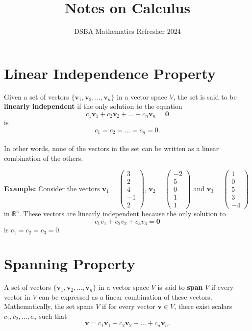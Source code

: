 \documentclass[]{article}
\title{Notes on Calculus}
\author{DSBA Mathematics Refresher 2024}
\date{}
\begin{document}
	
	\maketitle
	
	\begin{abstract}
		
	\end{abstract}
	
	
	\section{Linear Independence Property}
	
	Given a set of vectors $\{\mathbf{v}_1, \mathbf{v}_2, \dots, \mathbf{v}_n\}$ in a vector space $V$, the set is said to be \textbf{linearly independent} if the only solution to the equation
	$$
	c_1\mathbf{v}_1 + c_2\mathbf{v}_2 + \dots + c_n\mathbf{v}_n = \mathbf{0}
	$$
	is 
	$$
	c_1 = c_2 = \dots = c_n = 0.
	$$\\
	In other words, none of the vectors in the set can be written as a linear combination of the others.
	
	\noindent \textbf{Example:}
	Consider the vectors
	$\mathbf{v}_1 = \begin{pmatrix} 3 \\ 2 \\ 4 \\ -1 \\ 2 \end{pmatrix}$,
	$\mathbf{v}_2 = \begin{pmatrix} -2 \\ 5 \\ 0 \\ 1 \\ 1 \end{pmatrix}$
	and
	$\mathbf{v}_3 = \begin{pmatrix} 1 \\ 0 \\ 5 \\ 3 \\ -4 \end{pmatrix}$
	in $\mathbb{R}^5$.
	These vectors are linearly independent because the only solution to
	$$
	c_1v_1 + c_2v_2 + c_3v_3 = \mathbf{0}
	$$
	is $c_1 = c_2 = c_3 = 0$.
	
	\section{Spanning Property}
	
	A set of vectors $\{\mathbf{v}_1, \mathbf{v}_2, \dots, \mathbf{v}_n\}$ in a vector space $V$ is said to \textbf{span} $V$ if every vector in $V$ can be expressed as a linear combination of these vectors.
	Mathematically, the set spans $V$ if for every vector $\mathbf{v} \in V$, there exist scalars $c_1, c_2, \dots, c_n$ such that
	$$
	\mathbf{v} = c_1\mathbf{v}_1 + c_2\mathbf{v}_2 + \dots + c_n\mathbf{v}_n.
	$$
	
\end{document}
